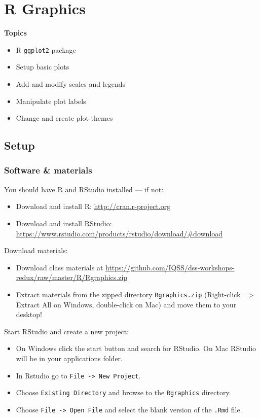 \documentclass[]{book}
\providecommand{\tightlist}{%
  \setlength{\itemsep}{0pt}\setlength{\parskip}{0pt}}
\begin{document}
\chapter{R Graphics}\label{r-graphics}

\textbf{Topics}

\begin{itemize}
\tightlist
\item
  R \texttt{ggplot2} package
\item
  Setup basic plots
\item
  Add and modify scales and legends
\item
  Manipulate plot labels
\item
  Change and create plot themes
\end{itemize}

\section{Setup}\label{setup-2}

\subsection{Software \& materials}\label{software-materials-2}

You should have R and RStudio installed --- if not:

\begin{itemize}
\tightlist
\item
  Download and install R: \url{http://cran.r-project.org}
\item
  Download and install RStudio:
  \url{https://www.rstudio.com/products/rstudio/download/\#download}
\end{itemize}

Download materials:

\begin{itemize}
\tightlist
\item
  Download class materials at
  \url{https://github.com/IQSS/dss-workshops-redux/raw/master/R/Rgraphics.zip}
\item
  Extract materials from the zipped directory \texttt{Rgraphics.zip}
  (Right-click =\textgreater{} Extract All on Windows, double-click on
  Mac) and move them to your desktop!
\end{itemize}

Start RStudio and create a new project:

\begin{itemize}
\tightlist
\item
  On Windows click the start button and search for RStudio. On Mac
  RStudio will be in your applications folder.
\item
  In Rstudio go to \texttt{File\ -\textgreater{}\ New\ Project}.
\item
  Choose \texttt{Existing\ Directory} and browse to the
  \texttt{Rgraphics} directory.
\item
  Choose \texttt{File\ -\textgreater{}\ Open\ File} and select the blank
  version of the \texttt{.Rmd} file.
\end{itemize}
\end{document}
